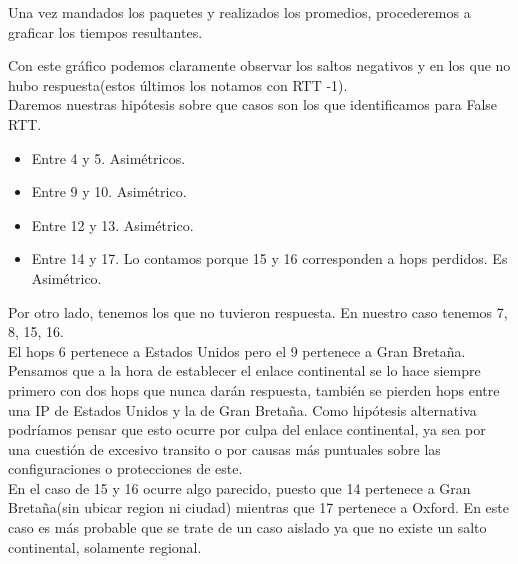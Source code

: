Una vez mandados los paquetes y realizados los promedios, procederemos a graficar los tiempos resultantes.

\begin{figure}[H]
    \centering
\end{figure}

Con este gráfico podemos claramente observar los saltos negativos y en los que no hubo respuesta(estos
últimos los notamos con RTT -1).\\

Daremos nuestras hipótesis sobre que casos son los que identificamos para False RTT.\\

\begin{itemize}
\item Entre 4 y 5. Asimétricos.
\item Entre 9 y 10. Asimétrico.
\item Entre 12 y 13. Asimétrico.
\item Entre 14 y 17. Lo contamos porque 15 y 16 corresponden a hops perdidos. Es Asimétrico.
\end{itemize}

Por otro lado, tenemos los que no tuvieron respuesta. En nuestro caso tenemos 7, 8, 15, 16.\\

El hops 6 pertenece a Estados Unidos pero el 9 pertenece a Gran Bretaña. Pensamos que a la hora de
establecer el enlace continental se lo hace siempre primero con dos hops que nunca darán respuesta, también se
pierden hops entre una IP de Estados Unidos y la de Gran Bretaña. Como hipótesis alternativa
podríamos pensar que esto ocurre por culpa del enlace continental, ya sea por una cuestión de
excesivo transito o por causas más puntuales sobre las configuraciones o protecciones de este.\\

En el caso de 15 y 16 ocurre algo parecido, puesto que 14 pertenece a Gran Bretaña(sin ubicar region
ni ciudad) mientras que 17 pertenece a Oxford. En este caso es más probable que se trate de un caso aislado
ya que no existe un salto continental, solamente regional.\\

